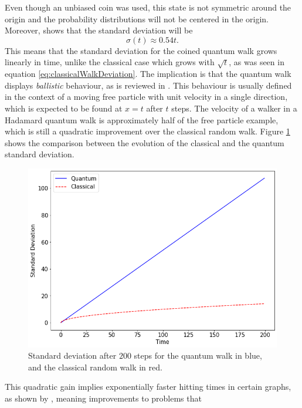 \documentclass[../../dissertation.tex]{subfiles}
\begin{document}
Even though an unbiased coin was used, this state is not symmetric around the origin and the probability distributions will not be centered in the origin. Moreover, \cite{REN1} shows that the standard deviation will be
\begin{equation}
	\sigma(t) \approx 0.54t .
\end{equation}
This means that the standard deviation for the coined quantum walk grows
linearly in time, unlike the classical case which grows with $\sqrt{t}$, as was
seen in equation \eqref{eq:classicalWalkDeviation}. The implication is that the
quantum walk displays \textit{ballistic} behaviour, as is reviewed in
\cite{andraca2012}. This behaviour is usually defined in the context of a
moving free particle with unit velocity in a single direction, which is
expected to be found at $x=t$ after $t$ steps. The velocity of a walker in a
Hadamard quantum walk is approximately half of the free particle example, which
is still a quadratic improvement over the classical random walk. Figure
\ref{fig:coinedClassicalStdDev} shows the comparison between the evolution of
the classical and the quantum standard deviation.
\begin{figure}[!h]
	\centering
	\includegraphics[scale=0.40]{img/CoinedQuantumWalk/coinedClassicalStdDev.png}
	\caption{Standard deviation after $200$ steps for the quantum walk in blue, and the classical random walk in red.} 
	\label{fig:coinedClassicalStdDev}
\end{figure}\par
This quadratic gain implies exponentially faster hitting times in certain
graphs, as shown by \cite{childs2002}, meaning improvements to problems that
\end{document}
